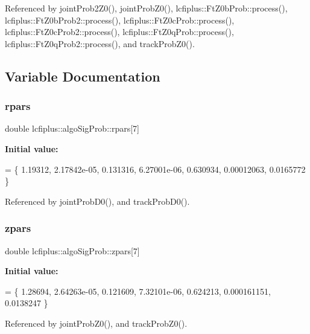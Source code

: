 Referenced by joint\+Prob2\+Z0(), joint\+Prob\+Z0(), lcfiplus\+::\+Ft\+Z0b\+Prob\+::process(), lcfiplus\+::\+Ft\+Z0b\+Prob2\+::process(), lcfiplus\+::\+Ft\+Z0c\+Prob\+::process(), lcfiplus\+::\+Ft\+Z0c\+Prob2\+::process(), lcfiplus\+::\+Ft\+Z0q\+Prob\+::process(), lcfiplus\+::\+Ft\+Z0q\+Prob2\+::process(), and track\+Prob\+Z0().



\subsection{Variable Documentation}
\mbox{\label{namespacelcfiplus_1_1algoSigProb_a326ec0f0497c4389a6a40ee5a7e7b85f}} 
\subsubsection{rpars}
{\footnotesize\ttfamily double lcfiplus\+::algo\+Sig\+Prob\+::rpars[7]}

{\bfseries Initial value\+:}
\begin{DoxyCode}
= \{
  1.19312,
  2.17842e-05,
  0.131316,
  6.27001e-06,
  0.630934,
  0.00012063,
  0.0165772
\}
\end{DoxyCode}


Referenced by joint\+Prob\+D0(), and track\+Prob\+D0().

\mbox{\label{namespacelcfiplus_1_1algoSigProb_a16dd326bd0db6084e4aace741538642e}} 
\subsubsection{zpars}
{\footnotesize\ttfamily double lcfiplus\+::algo\+Sig\+Prob\+::zpars[7]}

{\bfseries Initial value\+:}
\begin{DoxyCode}
= \{
  1.28694,
  2.64263e-05,
  0.121609,
  7.32101e-06,
  0.624213,
  0.000161151,
  0.0138247
\}
\end{DoxyCode}


Referenced by joint\+Prob\+Z0(), and track\+Prob\+Z0().

